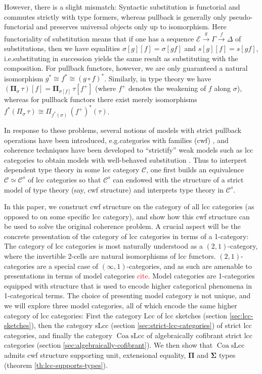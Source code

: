 \documentclass{article}
\newcommand{\todo}[1]{\textcolor{red}{#1}}
\theoremstyle{remark}
\theoremstyle{definition}
\begin{document}
However, there is a slight mismatch:
Syntactic substitution is functorial and commutes strictly with type formers, whereas pullback is generally only pseudo-functorial and preserves universal objects only up to isomorphism.
Here functoriality of substitution means that if one has a sequence $\mathcal{E} \xrightarrow{g} \Gamma \xrightarrow{f} \Delta$ of substitutions, then we have equalities $\sigma[g][f] = \sigma[gf]$ and $s[g][f] = s[gf]$, i.e.\@ substituting in succession yields the same result as substituting with the composition.
For pullback functors, however, we are only guaranteed a natural isomorphism $g^* \cong f^* \cong (g \circ f)^*$.
Similarly, in type theory we have $(\mathbf{\Pi}_\sigma \, \tau)[f] = \mathbf{\Pi}_{\sigma[f]} \, \tau[f^+]$ (where $f^+$ denotes the weakening of $f$ along $\sigma$), whereas for pullback functors there exist merely isomorphisms $f^*(\Pi_\sigma \, \tau) \cong \Pi_{f^*(\sigma)} \, (f^+)^*(\tau)$.

In response to these problems, several notions of models with strict pullback operations have been introduced, e.g.\@ categories with families (cwf) \cite{internal-type-theory}, and coherence techniques have been developed to ``strictify'' weak models such as lcc categories to obtain models with well-behaved substitution \cite{substitution-up-to-isomorphism,on-the-interpretation-of-type-theory-in-lcc-categories,the-local-universes-model}.
Thus to interpret dependent type theory in some lcc category $\mathcal{C}$, one first builds an equivalence $\mathcal{C} \simeq \mathcal{C}^s$ of lcc categories so that $\mathcal{C}^s$ can endowed with the structure of a strict model of type theory (say, cwf structure) and interprets type theory in $\mathcal{C}^s$.

In this paper, we construct cwf structure on the category of all lcc categories (as opposed to on some specific lcc category), and show how this cwf structure can be used to solve the original coherence problem.
A crucial aspect will be the concrete presentation of the category of lcc categories in terms of a 1-category:
The category of lcc categories is most naturally understood as a $(2, 1)$-category, where the invertible 2-cells are natural isomorphisms of lcc functors.
$(2, 1)$-categories are a special case of $(\infty, 1)$-categories, and as such are amenable to presentations in terms of model categories \todo{cite}.
Model categories are 1-categories equipped with structure that is used to encode higher categorical phenomena in 1-categorical terms.
The choice of presenting model category is not unique, and we will explore three model categories, all of which encode the same higher category of lcc categories:
First the category $\mathrm{Lcc}$ of lcc sketches (section \ref{sec:lcc-sketches}), then the category $\mathrm{sLcc}$ (section \ref{sec:strict-lcc-categories}) of strict lcc categories, and finally the category $\operatorname{Coa} \mathrm{sLcc}$ of algebraically cofibrant strict lcc categories (section \ref{sec:algebraically-cofibrant}).
We then show that $\operatorname{Coa} \mathrm{sLcc}$ admits cwf structure supporting unit, extensional equality, $\mathbf{\Pi}$ and $\mathbf{\Sigma}$ types (theorem \ref{th:lcc-supports-types}).
\end{document}
